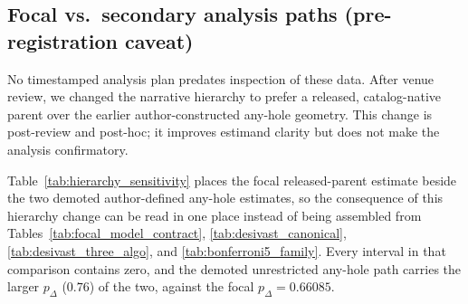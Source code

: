\documentclass[twocolumn,linenumbers]{aastex702}
\begin{document}
\subsection{Focal vs.\ secondary analysis paths (pre-registration
caveat)}\label{sec:primary_path}

No timestamped analysis plan predates inspection of these data. After
venue review, we changed the narrative hierarchy to prefer a released,
catalog-native parent over the earlier author-constructed any-hole
geometry. This change is post-review and post-hoc; it improves estimand
clarity but does not make the analysis confirmatory.

Table~\ref{tab:hierarchy_sensitivity} places the focal released-parent
estimate beside the two demoted author-defined any-hole estimates, so the
consequence of this hierarchy change can be read in one place instead of
being assembled from Tables~\ref{tab:focal_model_contract},
\ref{tab:desivast_canonical}, \ref{tab:desivast_three_algo}, and
\ref{tab:bonferroni5_family}. Every interval in that comparison contains
zero, and the demoted unrestricted any-hole path carries the larger
$p_\Delta$ ($0.76$) of the two, against the focal $p_\Delta = 0.66085$.
\end{document}
